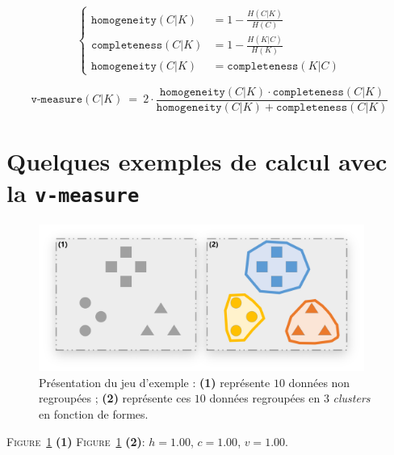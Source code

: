 		\begin{equation}
			\label{equation:D.1-ANNEXE-EVALUATION-CLUSTERING-DEFINITION-HOMEGENEITE-COMPLETENESS}
			\begin{cases}
				\texttt{homogeneity}(C|K)
					& =
					1
					-
					\frac{
						H(C|K)
					}{
						H(C)
					} \\
				\texttt{completeness}(C|K)
					& =
					1
					-
					\frac{
						H(K|C)
					}{
						H(K)
					} \\
				\texttt{homogeneity}(C|K)
					& = \texttt{completeness}(K|C)
			\end{cases}
		\end{equation}
		
		\begin{equation}
			\label{equation:D.1-ANNEXE-EVALUATION-CLUSTERING-DEFINITION-VMEASURE}
			\texttt{v-measure}(C|K)~=~2 \cdot \frac{
				\texttt{homogeneity}(C|K) \cdot \texttt{completeness}(C|K)
			}{
				\texttt{homogeneity}(C|K) + \texttt{completeness}(C|K)
			}
		\end{equation}

	\section{Quelques exemples de calcul avec la \texttt{v-measure}}
	\label{annex:D.2-ANNEXE-EVALUATION-CLUSTERING-EXEMPLE-VMEASURE}
	
		\begin{figure}[H]
			\centering
			\includegraphics[width=0.95\textwidth]{figures/annexe-vmeasure-presentation}
			\caption{
				Présentation du jeu d'exemple :
				\textbf{(1)} représente $10$ données non regroupées ;
				\textbf{(2)} représente ces $10$ données regroupées en $3$ \textit{clusters} en fonction de formes.
			}
			\label{figure:D.2-ANNEXE-EVALUATION-CLUSTERING-EXEMPLE-VMEASURE-0-PRESENTATION}
		\end{figure}
			\textsc{Figure~\ref{figure:D.2-ANNEXE-EVALUATION-CLUSTERING-EXEMPLE-VMEASURE-0-PRESENTATION}} \textbf{(1)}
			\textsc{Figure~\ref{figure:D.2-ANNEXE-EVALUATION-CLUSTERING-EXEMPLE-VMEASURE-0-PRESENTATION}} \textbf{(2)}: $h = 1.00$, $c = 1.00$, $v = 1.00$.
	
